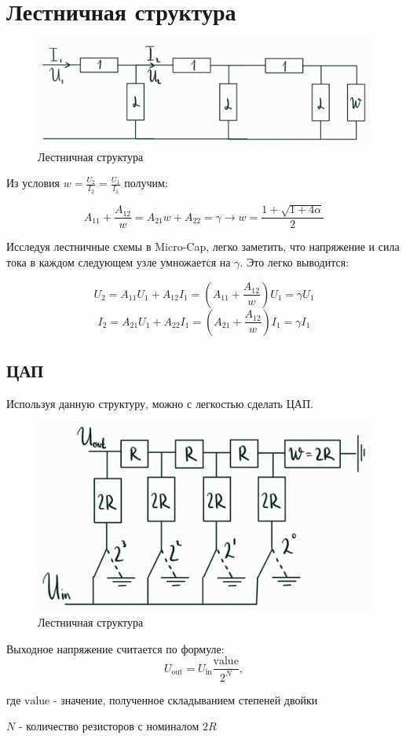 \documentclass[a4paper]{article}
\begin{document}
\section{Лестничная структура}

\begin{figure}[h!]
    \centering
    \includegraphics[width=0.5\pdfpagewidth]{stairs.png}
    \caption{Лестничная структура}
\end{figure}

Из условия $w = \frac{U_2}{I_2} = \frac{U_1}{I_1}$ получим:

\begin{equation}
    A_{11} + \frac{A_{12}}{w} = A_{21} w + A_{22} = \gamma \longrightarrow w = \frac{1 + \sqrt{1 + 4\alpha}}{2}
\end{equation}

Исследуя лестничные схемы в Micro-Cap, легко заметить, что напряжение и сила тока в каждом
следующем узле умножается на $\gamma$. Это легко выводится:

\begin{equation}
    U_2 = A_{11} U_1 + A_{12} I_1 = (A_{11} + \frac{A_{12}}{w})U_1 = \gamma U_1
\end{equation}
\begin{equation}
    I_2 = A_{21} U_1 + A_{22} I_1 = (A_{21} + \frac{A_{12}}{w})I_1 = \gamma I_1
\end{equation}

\newpage

\subsection{ЦАП}

Используя данную структуру, можно с легкостью сделать ЦАП.

\begin{figure}[h!]
    \centering
    \includegraphics[width=0.5\pdfpagewidth]{dac.png}
    \caption{Лестничная структура}
\end{figure}

Выходное напряжение считается по формуле:
\begin{equation}
    U_\text{out} = U_\text{in} \frac{\text{value}}{2^N},
\end{equation}

где $\text{value}$ - значение, полученное складыванием степеней двойки

$N$ - количество резисторов с номиналом $2R$
\end{document}
